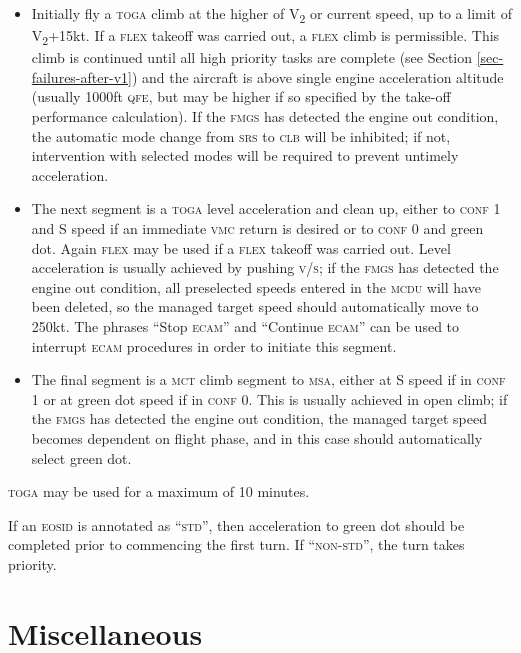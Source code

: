 \documentclass[a5paper,11pt,twoside]{book}
\newcommand{\ac}[1]{{\scshape\MakeLowercase{#1}}}
\newcommand{\cphrase}[1]{\ac{#1}}
\newcommand{\inlcite}[1]{{\ac{#1}}}
\newcommand{\multicite}[1]{%
  \nopagebreak
  \noindent{{\color{blue}\footnotesize[ \inlcite{#1} ]}}
}
\newcommand{\V}[1]{V\textsubscript{#1}}
\begin{document}
\begin{itemize}
\item Initially fly a \ac{TOGA} climb at the higher of \V{2} or current speed,
  up to a limit of \V{2}+15kt. If a \ac{FLEX} takeoff was carried out, a
  \ac{FLEX} climb is permissible. This climb is continued until all high
  priority tasks are complete (see Section \ref{sec-failures-after-v1}) and the aircraft is
  above single engine acceleration altitude (usually 1000ft \ac{QFE}, but may be
  higher if so specified by the take-off performance calculation). If the
  \ac{FMGS} has detected the engine out condition, the automatic mode change
  from \ac{SRS} to \ac{CLB} will be inhibited; if not, intervention with
  selected modes will be required to prevent untimely acceleration.

\item The next segment is a \ac{TOGA} level acceleration and clean up, either to
  \ac{Conf} 1 and S speed if an immediate \ac{VMC} return is desired or to
  \ac{Conf} 0 and green dot. Again \ac{FLEX} may be used if a \ac{FLEX} takeoff
  was carried out. Level acceleration is usually achieved by pushing \ac{V/S};
  if the \ac{FMGS} has detected the engine out condition, all preselected speeds
  entered in the \ac{MCDU} will have been deleted, so the managed target speed
  should automatically move to 250kt. The phrases ``Stop \ac{ECAM}'' and
  ``Continue \ac{ECAM}'' can be used to interrupt \ac{ECAM} procedures in order
  to initiate this segment.

\item The final segment is a \ac{MCT} climb segment to \ac{MSA}, either at S
  speed if in \ac{Conf} 1 or at green dot speed if in \ac{Conf} 0. This is
  usually achieved in open climb; if the \ac{FMGS} has detected the engine out
  condition, the managed target speed becomes dependent on flight phase, and in
  this case should automatically select green dot.
\end{itemize}

\ac{TOGA} may be used for a maximum of 10 minutes.

If an \ac{EOSID} is annotated as ``\cphrase{STD}'', then acceleration to green
dot should be completed prior to commencing the first turn. If
``\cphrase{NON-STD}'', the turn takes priority.

\multicite{EOMB~4.4.4, FCOM~DSC.22\_20.60.40}

\chapter{Miscellaneous}
\end{document}
